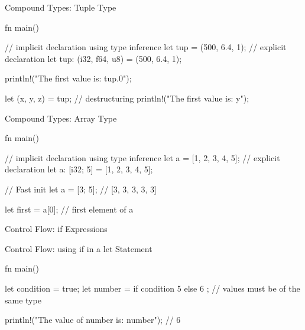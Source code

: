 \begin{frame}[fragile]{Compound Types: Tuple Type}
    \begin{code}
        fn main() {
            // implicit declaration using type inference
            let tup = (500, 6.4, 1); 
            // explicit declaration
            let tup: (i32, f64, u8) = (500, 6.4, 1);

            println!("The first value is: {tup.0}");

            let (x, y, z) = tup; // destructuring
            println!("The first value is: {y}");
        }
    \end{code}
\end{frame}

\begin{frame}[fragile]{Compound Types: Array Type}
    \begin{code}
        fn main() {
            // implicit declaration using type inference
            let a = [1, 2, 3, 4, 5];
            // explicit declaration
            let a: [i32; 5] = [1, 2, 3, 4, 5];

            // Fast init
            let a = [3; 5]; // [3, 3, 3, 3, 3]

            let first = a[0]; // first element of a
        }
    \end{code}
\end{frame}

\begin{frame}[fragile]{Control Flow: if Expressions}
\end{frame}

\begin{frame}[fragile]{Control Flow: using if in a let Statement}
    \begin{code}
        fn main() {
            let condition = true;
            let number = if condition { 5 } else { 6 };
            // values must be of the same type

            println!("The value of number is: {number}"); // 6
        }
    \end{code}
\end{frame}

